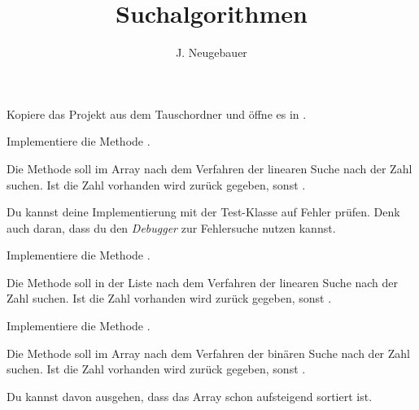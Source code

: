 \documentclass[10pt, a4paper]{scrartcl}
\author{J. Neugebauer}
\title{Suchalgorithmen}
\date{\Heute}
\begin{document}
\ReiheTitel

\begin{aufgabe}
	Kopiere das Projekt  aus dem Tauschordner und öffne es in .

	Implementiere die Methode .

	Die Methode soll im Array  nach dem Verfahren der linearen Suche nach der Zahl  suchen. Ist die Zahl vorhanden wird  zurück gegeben, sonst .

	Du kannst deine Implementierung mit der Test-Klasse auf Fehler prüfen. Denk auch daran, dass du den \emph{Debugger} zur Fehlersuche nutzen kannst.
\end{aufgabe}

\begin{aufgabe}
	Implementiere die Methode .

	Die Methode soll in der Liste  nach dem Verfahren der linearen Suche nach der Zahl  suchen. Ist die Zahl vorhanden wird  zurück gegeben, sonst .
\end{aufgabe}

\begin{aufgabe}
	Implementiere die Methode .

	Die Methode soll im Array  nach dem Verfahren der binären Suche nach der Zahl  suchen. Ist die Zahl vorhanden wird  zurück gegeben, sonst .

	Du kannst davon ausgehen, dass das Array  schon aufsteigend sortiert ist.


\end{aufgabe}
\end{document}
